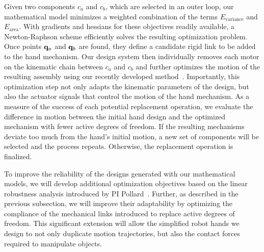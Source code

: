 Given two components $c_a$ and $c_b$, which are selected in an outer loop, our mathematical model minimizes a weighted combination of the terms $E_\mathrm{variance}$ and $E_\mathrm{area}$. With gradients and hessians for these objectives readily available, a Newton-Raphson scheme efficiently solves the resulting optimization problem. Once points $\mathbf{q}_a$ and $\mathbf{q}_b$ are found, they define a candidate rigid link to be added to the hand mechanism. Our design system then individually removes each motor on the kinematic chain between $c_a$ and $c_b$ and further optimizes the motion of the resulting assembly using our recently developed method~\cite{Bacher2015}. Importantly, this optimization step not only adapts the kinematic parameters of the design, but also the actuator signals that control the motion of the hand mechanism. As a measure of the success of each potential replacement operation, we evaluate the difference in motion between the initial hand design and the optimized mechanism with fewer active degrees of freedom. If the resulting mechanisms deviate too much from the hand's initial motion, a new set of components will be selected and the process repeats. Otherwise, the replacement operation is finalized.

To improve the reliability of the designs generated with our mathematical models, we will develop additional optimization objectives based on the linear robustness analysis introduced by PI Pollard~\cite{Pollard:WAFR02,pollard2004closure,pollard20045}. Further, as described in the previous subsection, we will improve their adaptability by optimizing the compliance of the mechanical links introduced to replace active degrees of freedom. This significant extension will allow the simplified robot hands we design to not only duplicate motion trajectories, but also the contact forces required to manipulate objects.


